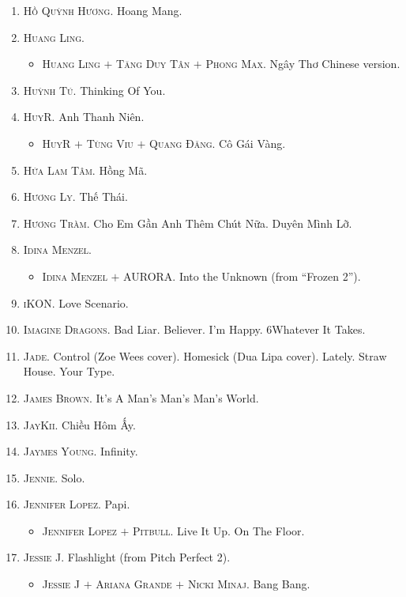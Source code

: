 \documentclass{article}
\numberwithin{equation}{section}
\begin{document}
\begin{enumerate}
\begin{itemize}
	\end{itemize}
	\item \textsc{Hồ Quỳnh Hương.} Hoang Mang.
	\item \textsc{Huang Ling.}
	\begin{itemize}
		\item \textsc{Huang Ling $+$ Tăng Duy Tân $+$ Phong Max.} Ngây Thơ Chinese version.
	\end{itemize}
	\item \textsc{Huỳnh Tú.} Thinking Of You.
	\item \textsc{HuyR.} Anh Thanh Niên.
	\begin{itemize}
		\item \textsc{HuyR $+$ Tùng Viu $+$ Quang Đăng.} Cô Gái Vàng.
	\end{itemize}
	\item \textsc{Hứa Lam Tâm.} Hồng Mã.
	\item \textsc{Hương Ly.} Thế Thái.
	\item \textsc{Hương Tràm.} Cho Em Gần Anh Thêm Chút Nữa. Duyên Mình Lỡ.
	\item \textsc{Idina Menzel.}
	\begin{itemize}
		\item \textsc{Idina Menzel $+$ AURORA.} Into the Unknown (from ``Frozen 2'').
	\end{itemize}
	\item \textsc{iKON.} Love Scenario. 
	\item \textsc{Imagine Dragons.} Bad Liar. Believer. I'm Happy. 6Whatever It Takes.
	\item \textsc{Jade.} Control (Zoe Wees cover). Homesick (Dua Lipa cover). Lately. Straw House. Your Type.
	\item \textsc{James Brown.} It's A Man's Man's Man's World.
	\item \textsc{JayKii.} Chiều Hôm Ấy.
	\item \textsc{Jaymes Young.} Infinity.
	\item \textsc{Jennie.} Solo.
	\item \textsc{Jennifer Lopez.} Papi.
	\begin{itemize}
		\item \textsc{Jennifer Lopez $+$ Pitbull.} Live It Up. On The Floor.
	\end{itemize}
	\item \textsc{Jessie J.} Flashlight (from Pitch Perfect 2).
	\begin{itemize}
		\item \textsc{Jessie J $+$ Ariana Grande $+$ Nicki Minaj.} Bang Bang.

\end{itemize}
\end{enumerate}
\end{document}
